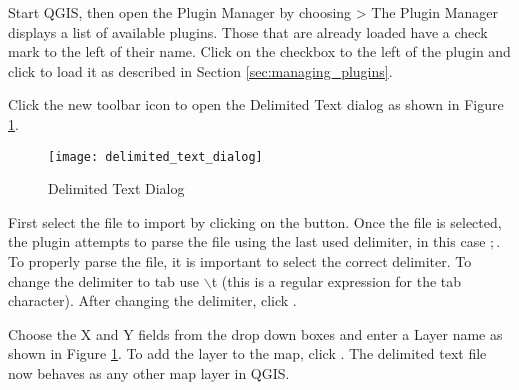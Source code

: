 Start QGIS, then open the Plugin Manager by choosing  > 
The Plugin Manager displays a list of available plugins.
Those that are already loaded have a check mark to the left of their name.
Click on the checkbox to the left of the  plugin and click  to load it as described in Section \ref{sec:managing_plugins}.

Click the new toolbar icon  to open the Delimited Text dialog as shown in Figure
\ref{fig:delim_text_plugin_dialog}.

\begin{figure}[ht]
   \begin{center}
   \caption{Delimited Text Dialog \nixcaption}\label{fig:delim_text_plugin_dialog}\smallskip
   \texttt{[image: delimited\_text\_dialog]}
   \end{center}  
\end{figure}

First select the file  to import by clicking 
on the  button. Once the file is selected, the plugin attempts to parse the file 
using the last used delimiter, in this case \mbox{$;$}. To properly parse the file, it 
is important to select the correct delimiter. To change the delimiter to tab use 
\mbox{$\backslash$}t (this is a regular expression for the tab character).
After changing the delimiter, click .

Choose the X and Y fields from the drop down boxes and enter a Layer name  
as shown in Figure \ref{fig:delim_text_plugin_dialog}. To add the layer to the map, click 
. The delimited text file now behaves as any other map layer in QGIS.
